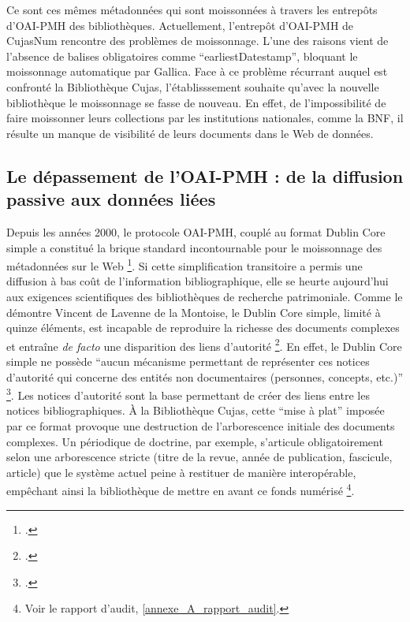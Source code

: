 Ce sont ces mêmes métadonnées qui sont moissonnées à travers les entrepôts d'\ac{OAI-PMH} des bibliothèques. Actuellement, l'entrepôt d'\ac{OAI-PMH} de CujasNum rencontre des problèmes de moissonnage. L'une des raisons vient de l'absence de balises obligatoires comme \enquote{earliestDatestamp}, bloquant le moissonnage automatique par Gallica. Face à ce problème récurrant auquel est confronté la Bibliothèque Cujas, l'établisssement souhaite qu'avec la nouvelle bibliothèque le moissonnage se fasse de nouveau. En effet, de l'impossibilité de faire moissonner leurs collections par les institutions nationales, comme la \ac{BNF}, il résulte un manque de visibilité de leurs documents dans le Web de données.

\subsection{Le dépassement de l'OAI-PMH : de la diffusion passive aux données liées}
Depuis les années 2000, le protocole \ac{OAI-PMH}, couplé au format Dublin Core simple a constitué la brique standard incontournable pour le moissonnage des métadonnées sur le Web \footcite{lavennedelamontoiseOAIPMHPMHLheure2020}. Si cette simplification transitoire a permis une diffusion à bas coût de l'information bibliographique, elle se heurte aujourd'hui aux exigences scientifiques des bibliothèques de recherche patrimoniale. Comme le démontre Vincent de Lavenne de la Montoise, le Dublin Core simple, limité à quinze éléments, est incapable de reproduire la richesse des documents complexes et entraîne \textit{de facto} une disparition des liens d'autorité \footcite{lavennedelamontoiseOAIPMHPMHLheure2020}. En effet, le Dublin Core simple ne possède \enquote{aucun mécanisme permettant de représenter ces notices d'autorité qui concerne des entités non documentaires (personnes, concepts, etc.)} \footcite{lavennedelamontoiseOAIPMHPMHLheure2020}. Les notices d'autorité sont la base permettant de créer des liens entre les notices bibliographiques. À la Bibliothèque Cujas, cette \enquote{mise à plat} imposée par ce format provoque une destruction de l'arborescence initiale des documents complexes. Un périodique de doctrine, par exemple, s'articule obligatoirement selon une arborescence stricte  (titre de la revue, année de publication, fascicule, article) que le système actuel peine à restituer de manière interopérable, empêchant ainsi la bibliothèque de mettre en avant ce fonds numérisé \footnote{Voir le rapport d'audit, \ref{annexe_A_rapport_audit}.}.

